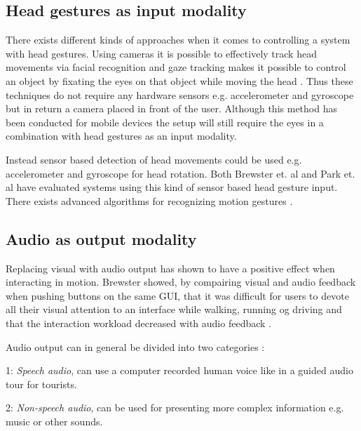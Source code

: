 \subsection{Head gestures as input modality}

There exists different kinds of approaches when it comes to controlling a system with head gestures. Using cameras it is possible to effectively track head movements via facial recognition \cite{morimoto_recognition_1996} and gaze tracking makes it possible to control an object by fixating the eyes on that object while moving the head \cite{vspakov_enhanced_2012}. Thus these techniques do not require any hardware sensors e.g. accelerometer and gyroscope but in return a camera placed in front of the user. Although this method has been conducted for mobile devices \cite{mardanbegi_eye-based_2012} the setup will still require the eyes in a combination with head gestures as an input modality.

Instead sensor based detection of head movements could be used e.g. accelerometer and gyroscope for head rotation. Both Brewster et. al \cite{brewster_multimodaleyes-freeinteraction_2003} and Park et. al \cite{park_gaze-directed_2011} have evaluated systems using this kind of sensor based head gesture input. There exists advanced algorithms for recognizing motion gestures \cite{lu_head_2005, kratz_combining_2013, akl_accelerometer-based_2010}.

\subsection{Audio as output modality}
\label{sec:audiomodality}
Replacing visual with audio output has shown to have a positive effect when interacting in motion. Brewster showed, by compairing visual and audio feedback when pushing buttons on the same GUI, that it was difficult for users to devote all their visual attention to an interface while walking, running og driving and that the interaction workload decreased with audio feedback \cite{brewster_overcoming_2002}.

Audio output can in general be divided into two categories \cite{rocchesso_sounding_2003}:
\begin{description}
\item{1: \textit{Speech audio}}, can use a computer recorded human voice like in a guided audio tour for tourists.
\item{2: \textit{Non-speech audio}}, can be used for presenting more complex information e.g. music or other sounds.
\end{description}

